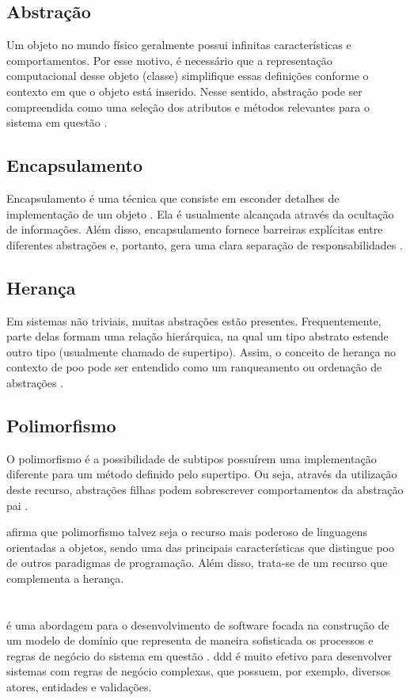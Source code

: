 \subsection{Abstração}
Um objeto no mundo físico geralmente possui infinitas características e comportamentos. Por esse motivo, é necessário que a representação computacional desse objeto (classe) simplifique essas definições conforme o contexto em que o objeto está inserido. Nesse sentido, abstração pode ser compreendida como uma seleção dos atributos e métodos relevantes para o sistema em questão \cite{booch2006}.

\subsection{Encapsulamento}
Encapsulamento é uma técnica que consiste em esconder detalhes de implementação de um objeto \cite{booch2006}. Ela é usualmente alcançada através da ocultação de informações. Além disso, encapsulamento fornece barreiras explícitas entre diferentes abstrações e, portanto, gera uma clara separação de responsabilidades \cite{booch2006}.

\subsection{Herança}
Em sistemas não triviais, muitas abstrações estão presentes. Frequentemente, parte delas formam uma relação hierárquica, na qual um tipo abstrato estende outro tipo (usualmente chamado de supertipo). Assim, o conceito de herança no contexto de \acrshort{poo} pode ser entendido como um ranqueamento ou ordenação de abstrações \cite{booch2006}.

\subsection{Polimorfismo}
O polimorfismo é a possibilidade de subtipos possuírem uma implementação diferente para um método definido pelo supertipo. Ou seja, através da utilização deste recurso, abstrações filhas podem sobrescrever comportamentos da abstração pai \cite{aragao2013java}.

 afirma que polimorfismo talvez seja o recurso mais poderoso de linguagens orientadas a objetos, sendo uma das principais características que distingue \acrshort{poo} de outros paradigmas de programação. Além disso, trata-se de um recurso que complementa a herança.

\section{} 
 é uma abordagem para o desenvolvimento de software focada na construção de um modelo de domínio que representa de maneira sofisticada os processos e regras de negócio do sistema em questão \cite{dddFowler}. \acrshort{ddd} é muito efetivo para desenvolver sistemas com regras de negócio complexas, que possuem, por exemplo, diversos atores, entidades e validações.

